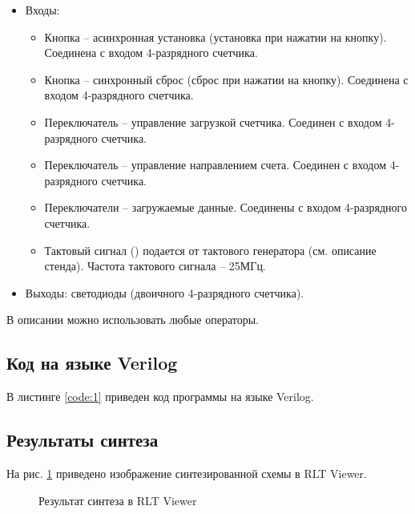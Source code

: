 \begin{itemize}
\begin{table}[H]
\end{table}	
\vspace{-0.5cm}
	\item Входы:
		\begin{itemize}
			\item Кнопка  -- асинхронная установка (установка при нажатии на кнопку). Соединена с входом  4-разрядного счетчика.
			\item Кнопка  -- синхронный сброс (сброс при нажатии на кнопку). Соединена с входом  4-разрядного счетчика.
			\item Переключатель  -- управление загрузкой счетчика. Соединен с входом  4-разрядного счетчика.
			\item Переключатель  -- управление направлением счета. Соединен с входом  4-разрядного счетчика.
			\item Переключатели  -- загружаемые данные. Соединены с входом  4-разрядного счетчика.
			\item Тактовый сигнал () подается от тактового генератора (см. описание стенда). Частота тактового сигнала – 25МГц.
		\end{itemize}
	\item Выходы: светодиоды  (двоичного 4-разрядного счетчика).
\end{itemize}

В описании можно использовать любые операторы.

\subsection{Код на языке Verilog}

В листинге \ref{code:1} приведен код программы на языке Verilog.

%

\subsection{Результаты синтеза}

На рис. \ref{fig:lab4_1_rtl} приведено изображение синтезированной схемы в RLT Viewer.

\begin{figure}[H]
\begin{center}
	\caption{Результат синтеза в RLT Viewer}
	\label{fig:lab4_1_rtl}
\end{center}
\end{figure}

